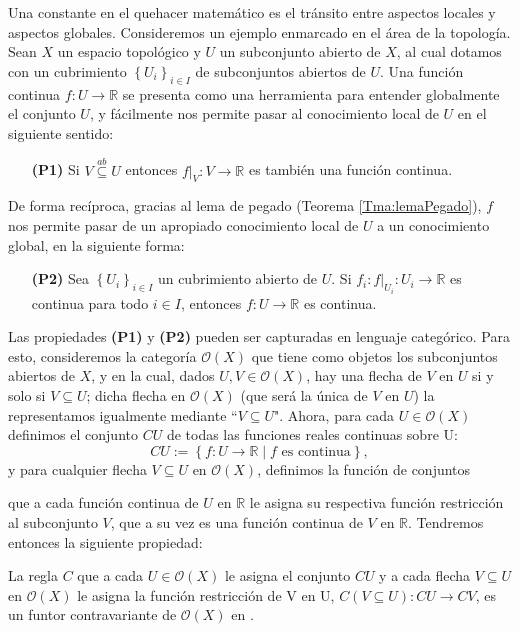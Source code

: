 Una constante en el quehacer matemático es el tránsito entre aspectos locales y aspectos globales. Consideremos un ejemplo enmarcado en el área de la topología. Sean $X$ un espacio topológico y $U$ un subconjunto abierto de $X$, al cual dotamos con un cubrimiento $\left\lbrace U_i\right\rbrace_{i\in I}$ de subconjuntos abiertos de $U$. Una función continua $f:U\to \mathbb{R}$ se presenta como una herramienta para entender globalmente el conjunto $U$, y fácilmente nos permite pasar al conocimiento local de $U$ en el siguiente sentido:
\begin{itemize}
   \item[\textbf{(P1)}] Si $V\stackrel{ab}\subseteq U$ entonces $f|_V:V\to\mathbb{R}$ es también una función continua. 
\end{itemize}
De forma recíproca, gracias al lema de pegado (Teorema \ref{Tma:lemaPegado}), $f$ nos permite pasar de un apropiado conocimiento local de $U$ a un conocimiento global, en la siguiente forma:
\begin{itemize}
   \item[\textbf{(P2)}] Sea $\left\lbrace U_i\right\rbrace_{i\in I}$ un cubrimiento abierto de $U$. Si $f_i:f|_{U_i}:U_i\to\mathbb{R}$ es continua para todo $i\in I$, entonces $f:U\to\mathbb{R}$ es continua.
\end{itemize}
Las propiedades \textbf{(P1)} y \textbf{(P2)} pueden ser capturadas en lenguaje categórico. Para esto, consideremos la categoría $\mathcal{O}(X)$ que tiene como objetos los subconjuntos abiertos de $X$, y en la cual, dados $U,V\in \mathcal{O}(X)$, hay una flecha de $V$ en $U$ si y solo si $V\subseteq U$; dicha flecha en $\mathcal{O}(X)$ (que será la única de $V$ en $U$) la representamos igualmente mediante ``$V\subseteq U$". Ahora, para cada $U\in\mathcal{O}(X)$ definimos el conjunto $CU$ de todas las funciones reales continuas sobre U:
$$
CU:=\left\lbrace f:U\to\mathbb{R}\mid f \text{ es continua}\right\rbrace,
$$
y para cualquier flecha $V\subseteq U$ en $\mathcal{O}(X)$, definimos la función de conjuntos

que a cada función continua de $U$ en $\mathbb{R}$ le asigna su respectiva función restricción al subconjunto $V$, que a su vez es una función continua de $V$ en $\mathbb{R}$. Tendremos entonces la siguiente propiedad:
\begin{Prop}\label{Prop:P1}
   La regla $C$ que a cada $U\in\mathcal{O}(X)$ le asigna el conjunto $CU$ y a cada flecha $V\subseteq U$ en $\mathcal{O}(X)$ le asigna la función restricción de V en U, $C(V\subseteq U): CU\to CV$, es un funtor contravariante de $\mathcal{O}(X)$ en .
\end{Prop}
